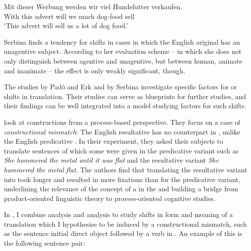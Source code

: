 \documentclass[output=paper]{LSP/langsci}
\begin{document}
\ea\label{czulo:ex:7}
\gll Mit dieser Werbung werden wir viel Hundefutter verkaufen. \\
With this advert will we much dog-food sell \\
\glt `This advert will sell us a lot of dog food.'
\z

Serbina finds a tendency for shifts in cases in which the English original has an unagentive subject. According to her evaluation scheme -- in which she does not only distinguish between agentive and unagentive, but between human, animate and inanimate -- the effect is only weakly significant, though.

The studies by Padó and Erk and by Serbina investigate specific factors for  or  shifts in translation. Their studies can serve as blueprints for further studies, and their findings can be well integrated into a model studying factors for such shifts.

\citet{Rojo2013} look at constructions from a process-based perspective. They focus on a case of \textit{constructional mismatch}: The English resultative  has no counterpart in , unlike the English predicative . In their experiment, they asked their subjects to translate sentences of which some were given in the predicative variant such as \textit{She hammered the metal until it was flat} and the resultative variant \textit{She hammered the metal flat}. The authors find that translating the resultative variant into  took longer and resulted in more fixations than for the predicative variant, underlining the relevance of the concept of a  in the  and building a bridge from product-oriented linguistic theory to process-oriented cognitive studies.

In \citet{Culo2013}, I combine  analysis and  analysis to study shifts in form and meaning of a translation which I hypothesise to be induced by a constructional mismatch, such as the sentence initial direct object followed by a verb in . An example of this is the following sentence pair:
\end{document}
